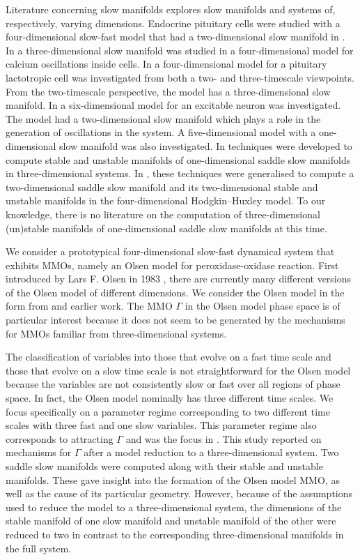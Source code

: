 \documentclass{ws-ijbc}
\begin{document}
Literature concerning slow manifolds explores slow manifolds and systems of, respectively, varying dimensions. Endocrine pituitary cells were studied with a four-dimensional slow-fast model that had a two-dimensional slow manifold in \cite{Vo_paper2}.  In \cite{Emily_Harvey_paper} a three-dimensional slow manifold was studied in a four-dimensional model for calcium oscillations inside cells. In \cite{Vo_paper} a four-dimensional model for a pituitary lactotropic cell was investigated from both a two- and three-timescale viewpoints.  From the two-timescale perspective, the model has a three-dimensional slow manifold.  In \cite{Martin_neuron_paper} a six-dimensional model for an excitable neuron was investigated.  The model had a two-dimensional slow manifold which plays a role in the generation of oscillations in the system.  A five-dimensional model with a one-dimensional slow manifold was also investigated.  In \cite{Saeed_Paper} techniques were developed to compute stable and unstable manifolds of one-dimensional saddle slow manifolds in three-dimensional systems. In \cite{Cris_paper}, these techniques were generalised to compute a two-dimensional saddle slow manifold and its two-dimensional stable and unstable manifolds in the four-dimensional Hodgkin--Huxley model.  To our knowledge, there is no literature on the computation of three-dimensional (un)stable manifolds of one-dimensional saddle slow manifolds at this time.

We consider a prototypical four-dimensional slow-fast dynamical system that exhibits MMOs, namely an Olsen model for peroxidase-oxidase reaction.  First introduced by Lars F. Olsen in 1983  \cite{Olsen}, there are currently many different versions of the Olsen model of different dimensions.  We consider the Olsen model in the form from \cite{Rescaling} and earlier work.  The MMO $\Gamma$ in the Olsen model phase space is of particular interest because it does not seem to be generated by the mechanisms for MMOs familiar from three-dimensional systems.

The classification of variables into those that evolve on a fast time scale and those that evolve on a slow time scale is not straightforward for the Olsen model because the variables are not consistently slow or fast over all regions of phase space.  In fact, the Olsen model nominally has three different time scales.  We focus specifically on a parameter regime corresponding to two different time scales with three fast and one slow variables.  This parameter regime also corresponds to attracting $\Gamma$ and was the focus in \cite{QSSA}.  This study reported on mechanisms for $\Gamma$ after a model reduction to a three-dimensional system.  Two saddle slow manifolds were computed along with their stable and unstable manifolds.  These gave insight into the formation of the Olsen model MMO, as well as the cause of its particular geometry.  However, because of the assumptions used to reduce the model to a three-dimensional system, the dimensions of the stable manifold of one slow manifold and unstable manifold of the other were reduced to two in contrast to the corresponding three-dimensional manifolds in the full system.  
\end{document}
